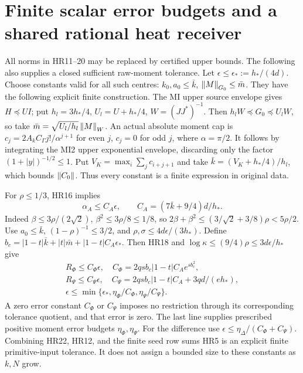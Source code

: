 \documentclass[11pt]{article}
\begin{document}
\section{Finite scalar error budgets and a shared rational heat receiver}

All norms in HR11--20 may be replaced by certified upper bounds.
The following also supplies a closed sufficient raw-moment tolerance.
Let \(\epsilon\le\epsilon_*:=h_*/(4d)\). Choose constants valid for
all such centres:
\(k_0,a_0\le\bar k\), \(\left\lVert M\right\rVert_{G_0}\le\bar m\).
They have the following explicit finite construction. The MI upper
source envelope gives \(H\preceq UI\); put
\(h_l=3h_*/4\), \(U_l=U+h_*/4\), \(W=(JJ^*)^{-1}\).
Then \(h_lW\preceq G_0\preceq U_lW\), so take
\(\bar m=\sqrt{U_l/h_l}\left\lVert M\right\rVert_W\).
An actual absolute moment cap is
\(c_j=2A_kC_\Gamma j!/\alpha^{j+1}\) for even \(j\),
\(c_j=0\) for odd \(j\), where \(\alpha=\pi/2\).
It follows by integrating the MI2 upper exponential envelope,
discarding only the factor \((1+|y|)^{-1/2}\le1\).
Put \(V_K=\max_i\sum_j c_{i+j+1}\) and take
\(\bar k=(V_K+h_*/4)/h_l\), which bounds \(\left\lVert C_0\right\rVert\).
Thus every constant is a finite expression in original data.

For \(\rho\le1/3\), HR16 implies
\begin{equation}\tag{HR21}\label{hrv:HR21}
\alpha_A\le C_A\epsilon,\qquad
C_A=(7\bar k+9/4)d/h_*.
\end{equation}
Indeed \(\beta\le3\rho/(2\sqrt2)\),
\(\beta^2\le3\rho/8\le1/8\), so
\(2\beta+\beta^2\le(3/\sqrt2+3/8)\rho<5\rho/2\).
Use \(a_0\le\bar k\), \((1-\rho)^{-1}\le3/2\), and
\(\rho,\sigma\le4d\epsilon/(3h_*)\).
Define \(b_c=|1-t|\bar k+|t|\bar m+|1-t|C_A\epsilon_*\).
Then HR18 and \(\log\kappa\le(9/4)\rho\le3d\epsilon/h_*\) give
\begin{equation}\tag{HR22}\label{hrv:HR22}
\begin{gathered}
R_\Phi\le C_\Phi\epsilon,\quad
C_\Phi=2qs b_c|1-t|C_A e^{s b_c^2},\\
R_\Psi\le C_\Psi\epsilon,\quad
C_\Psi=2qs b_c|1-t|C_A+3qd/(e h_*),\\
\epsilon\le\min\{\epsilon_*,\eta_\Phi/C_\Phi,
\eta_\Psi/C_\Psi\}.
\end{gathered}
\end{equation}
A zero error constant \(C_\Phi\) or \(C_\Psi\) imposes no restriction
through its corresponding tolerance quotient, and that error is zero.
The last line supplies prescribed positive moment
error budgets \(\eta_\Phi,\eta_\Psi\). For the difference use
\(\epsilon\le\eta_\Delta/(C_\Phi+C_\Psi)\). Combining HR22, HR12,
and the finite seed row sums HR5 is an explicit finite primitive-input
tolerance. It does not assign a bounded size to these constants as
\(k,N\) grow.
\end{document}
